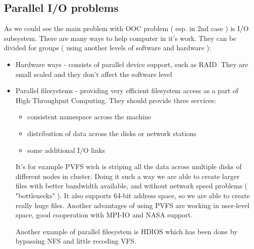 \subsection{Parallel I/O problems}
As we could see the main problem with OOC problem ( esp. in 2nd case ) is I/O subsystem.
There are many ways to help computer in it's work.
They can be divided for groups ( using another levels of software and hardware ):
\begin{itemize}
	\item{Hardware ways} - consists of parallel device support, such as RAID. They are small scaled and they don't affect the software level
	\item{Parallel filesystems} - providing very efficient filesystem access as a part of High Throughput Computing. They should provide three services:
	\begin{itemize}
		\item{consistent namespace across the machine}
		\item{distribution of data across the disks or network stations}
		\item{some additional I/O links}
	\end{itemize}
	It's for example PVFS wich is striping all the data across multiple disks of different nodes in cluster.
	Doing it such a way we are able to create larger files with better bandwidth available, and without network speed problems ( "bottlenecks" ).
	It also supports 64-bit address space, so we are able to create really huge files.
	Another advantages of using PVFS are working in user-level space, good cooperation with MPI-IO and NASA support.\cite{pvfs}

	Another example of parallel filesystem is HDIOS which has been done by bypassing NFS and little recoding VFS.
	

\end{itemize}

